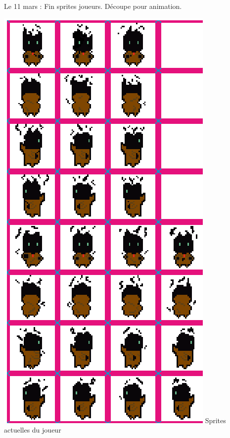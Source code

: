 \documentclass[]{extarticle}
\begin{document}
\begin{spacing}{1.25}
Le 11 mars : Fin sprites joueurs. Découpe pour animation.
 \bigbreak
\begin{center}
\includegraphics[scale = 0.25]{spritePerso.png}
\bigbreak
Sprites actuelles du joueur
\end{center}
\bigbreak

\end{spacing}
\end{document}

